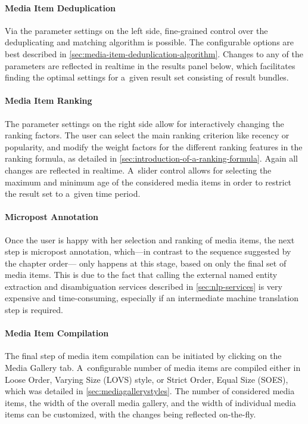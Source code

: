\paragraph{Media Item Deduplication}

Via the parameter settings on the left side, 
fine-grained control over the deduplicating
and matching algorithm is possible. 
The configurable options are best described in \autoref{sec:media-item-deduplication-algorithm}.
Changes to any of the parameters are reflected in realtime
in the results panel below, which facilitates finding the optimal 
settings for a~given result set consisting of result bundles.

\paragraph{Media Item Ranking}

The parameter settings on the right side 
allow for interactively changing the ranking factors.
The user can select the main ranking criterion like recency or popularity, and modify the weight factors 
for the different ranking features in the ranking formula,
as detailed in \autoref{sec:introduction-of-a-ranking-formula}.
Again all changes are reflected in realtime.
A~slider control allows for selecting the maximum 
and minimum age of the considered media items 
in order to restrict the result set to a~given time period.

\paragraph{Micropost Annotation}

Once the user is happy with her selection and ranking of media items,
the next step is micropost annotation,
which---in contrast to the sequence suggested by the chapter order---%
only happens at this stage, based on only the final set of media items.
This is due to the fact that calling the external
named entity extraction and disambiguation services described in
\autoref{sec:nlp-services} is very expensive and time-consuming,
especially if an intermediate machine translation step is required.

\paragraph{Media Item Compilation}

The final step of media item compilation can be initiated
by clicking on the Media Gallery tab.
A~configurable number of media items are compiled either in 
Loose Order, Varying Size (LOVS) style, or 
Strict Order, Equal Size (SOES), which was detailed in 
\autoref{sec:mediagallerystyles}.
The number of considered media items,
the width of the overall media gallery,
and the width of individual media items can be customized,
with the changes being reflected on-the-fly.

